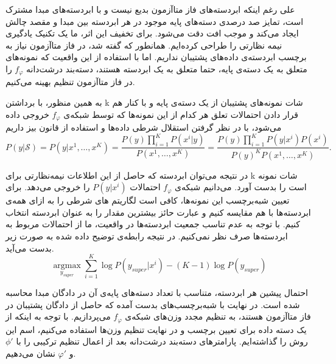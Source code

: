     علی رغم اینکه ابردسته‌های فاز متاآزمون بدیع نیست و با ابردسته‌های مبدا مشترک است، تمایز صد درصدی دسته‌های پایه موجود در هر ابردسته بین مبدا و مقصد چالش ایجاد می‌کند و موجب افت دقت می‌شود. برای تخفیف این اثر، ما یک تکنیک یادگیری نیمه نظارتی را طراحی کرده‌ایم. همانطور که گفته شد، در فاز متاآزمون نیاز به برچسب ابردسته‌ی داده‌های پشتیبان نداریم. اما با استفاده از این واقعیت که نمونه‌های متعلق به یک دسته‌ی پایه، حتما متعلق به یک ابردسته هستند، دسته‌بند درشت‌دانه 
        $f_{\varphi}$
        را در فاز متاآزمون تنظیم بهینه می‌کنیم.
        
        به همین منظور، با برداشتن k شات نمونه‌های پشتیبان از یک دسته‌ی پایه و با کنار هم قرار دادن احتمالات تعلق هر کدام از این نمونه‌ها که توسط شبکه‌ی 
            $f_{\varphi}$
            خروجی داده می‌شود، با در نظر گرفتن استقلال شرطی داده‌ها و استفاده از قانون بیز داریم
        \begin{equation}\label{eq:phi:mixedtune}
        	P(y|\mathcal{S}) = P(y|x^1, \dots, x^K) = \frac{P(y) \prod_{i=1}^{K} P(x^i|y)}{P(x^1, \dots, x^K)} = \frac{P(y)\prod_{i=1}^{K} P(y|x^i)P(x^i)}{P(y)^{K}P(x^1, \dots, x^K)}.
        \end{equation}
    
    در نتیجه می‌توان 
    ابردسته که حاصل از این اطلاعات نیمه‌نظارتی برای k شات نمونه است را بدست آورد. می‌دانیم شبکه‌ی 
            $f_{\varphi}$
  احتمالات 
  $P(y|x^i)$
  را خروجی می‌دهد. برای تعیین شبه‌برچسب این نمونه‌ها، کافی است لگاریتم 
  های شرطی را به ازای همه‌ی ابردسته‌ها با هم مقایسه کنیم و عبارت حائز بیشترین مقدار را به عنوان ابردسته انتخاب کنیم. با توجه به عدم تناسب جمعیت ابردسته‌ها در واقعیت، ما از احتمالات 
  مربوط به ابردسته‌ها صرف نظر نمی‌کنیم. در نتیجه رابطه‌ی توضیح داده شده به صورت زیر بدست می‌آید.
\begin{equation}
	\underset{y_{super}}{\operatorname*{argmax}} \sum_{i=1}^K\log P(y_{super}|x^i) - (K-1)\log P(y_{super})
\end{equation}

احتمال پیشین هر ابردسته، متناسب با تعداد دسته‌های پایه‌ی آن در دادگان مبدا محاسبه شده است. در نهایت با شبه‌برچسب‌های بدست آمده که حاصل از دادگان پشتیبان در فاز متاآزمون هستند، به تنظیم مجدد وزن‌های شبکه‌ی 
$f_{\varphi}$
می‌پردازیم. با توجه به اینکه از یک دسته داده برای تعیین برچسب و در نهایت تنظیم وزن‌ها استفاده می‌کنیم، اسم این روش را
 گذاشته‌ایم. پارامترهای دسته‌بند درشت‌دانه بعد از اعمال تنظیم ترکیبی را با 
 $\phi'$
 و 
 $\varphi'$
 نشان می‌دهیم.
 
